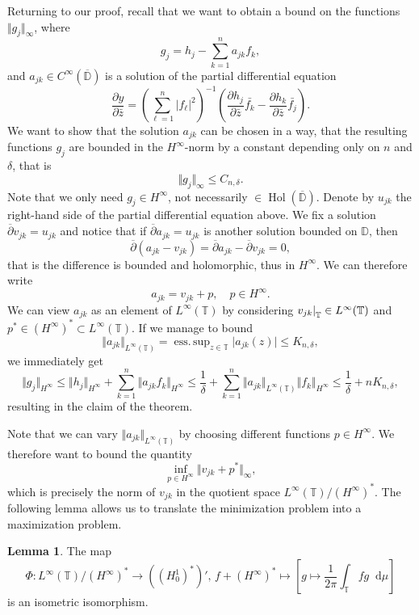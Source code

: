 \documentclass[letterpaper, 11pt]{article}
\newcommand{\D}{\mathbb{D}}
\newcommand{\T}{\mathbb{T}}
\newcommand{\1}{\mathds{1}}
\newcommand{\dd}{\mathop{}\!\mathrm{d}}
\newcommand{\cl}[1]{\overline{#1}}
\newcommand{\restr}[2]{{%
  \left.\kern-\nulldelimiterspace %
  #1 %
  \littletaller %
  \right|_{#2} %
  }}
\newcommand{\littletaller}{\mathchoice{\vphantom{\big|}}{}{}{}}
\newcommand{\Wirtzbar}[1][]{\frac{\partial #1}{\partial \bar{z}}}
\newcommand{\wirtzbar}{\overline{\partial}}
\DeclareMathOperator*{\Hol}{Hol}
\DeclareMathOperator*{\esssup}{ess.\,sup}
\theoremstyle{definition}
\newtheorem{lemma}[theorem]{Lemma}
\newenvironment{innerproof}
 {\renewcommand{\qedsymbol}{}\proof}
 {\endproof}
\begin{document}
\begin{innerproof}[Proof (continued)]
  Returning to our proof, recall that we want to obtain a bound on the functions $\Vert g_j \Vert_\infty$, where
  $$ g_j = h_j - \sum_{k=1}^n a_{jk} f_k, $$
  and $a_{jk} \in C^\infty(\cl{\D})$ is a solution of the partial differential equation
  $$ \Wirtzbar[y] = \left( \sum_{\ell=1}^n \vert f_\ell \vert^2 \right)^{-1} \left( \Wirtzbar[h_j] \bar{f_k} - \Wirtzbar[h_k] \bar{f_j} \right). $$
  We want to show that the solution $a_{jk}$ can be chosen in a way, that the resulting functions $g_j$ are bounded in the $H^\infty$-norm by a constant depending only on $n$ and $\delta$, that is
  $$ \Vert g_j \Vert_\infty \leq C_{n, \delta}. $$
  Note that we only need $g_j \in H^\infty$, not necessarily $\in \Hol(\cl{\D})$. Denote by $u_{jk}$ the right-hand side of the partial differential equation above. We fix a solution $\wirtzbar v_{jk} = u_{jk}$ and notice that if $\wirtzbar a_{jk} = u_{jk}$ is another solution bounded on $\D$, then
  $$ \wirtzbar (a_{jk} - v_{jk}) = \wirtzbar a_{jk} - \wirtzbar v_{jk} = 0, $$
  that is the difference is bounded and holomorphic, thus in $H^\infty$. We can therefore write
  $$ a_{jk} = v_{jk} + p, \quad p \in H^\infty. $$
  We can view $a_{jk}$ as an element of $L^\infty(\T)$ by considering $\restr{v_{jk}}{\T} \in L^\infty(\T)$ and $p^* \in (H^\infty)^* \subset L^\infty(\T)$. If we manage to bound
  $$ \Vert a_{jk} \Vert_{L^\infty(\T)} = \esssup_{z \in \T} \vert a_{jk}(z) \vert \leq K_{n,\delta}, $$
  we immediately get
  $$ \Vert g_j \Vert_{H^\infty} \leq \Vert h_j \Vert_{H^\infty} + \sum_{k=1}^n \Vert a_{jk} f_k \Vert_{H^\infty} \leq \frac{1}{\delta} + \sum_{k=1}^n \Vert a_{jk} \Vert_{L^\infty(\T)} \Vert f_k \Vert_{H^\infty} \leq \frac{1}{\delta} + n K_{n, \delta}, $$
  resulting in the claim of the theorem.

  Note that we can vary $\Vert a_{jk} \Vert_{L^\infty(\T)}$ by choosing different functions $p \in H^\infty$. We therefore want to bound the quantity
  $$ \inf_{p \in H^\infty} \Vert v_{jk} + p^* \Vert_\infty, $$
  which is precisely the norm of $v_{jk}$ in the quotient space $L^\infty(\T) / (H^\infty)^*$. The following lemma allows us to translate the minimization problem into a maximization problem.
\end{innerproof}

\begin{lemma}
  The map
  \begin{equation*}
    \Phi : L^\infty(\T) / (H^\infty)^* \to ((H_0^1)^*)',\, f + (H^\infty)^* \mapsto \left[ g \mapsto \frac{1}{2 \pi} \int_\T f g \dd \mu \right]
  \end{equation*}
  is an isometric isomorphism.
\end{lemma}
\end{document}
